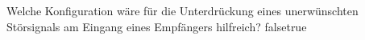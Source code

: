     {Welche Konfiguration wäre für die Unterdrückung eines unerwünschten Störsignals am Eingang eines Empfängers hilfreich?}
    {}
    {}
    {}
    {}
    {false}{true}